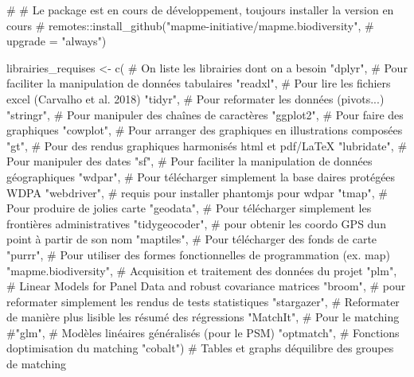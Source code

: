\documentclass[
  letterpaper,
  DIV=11,
  numbers=noendperiod]{scrreprt}
\newenvironment{Shaded}{\begin{snugshade}}{\end{snugshade}}
\newcommand{\CommentTok}[1]{\textcolor[rgb]{0.37,0.37,0.37}{#1}}
\newcommand{\FunctionTok}[1]{\textcolor[rgb]{0.28,0.35,0.67}{#1}}
\newcommand{\NormalTok}[1]{\textcolor[rgb]{0.00,0.23,0.31}{#1}}
\newcommand{\OtherTok}[1]{\textcolor[rgb]{0.00,0.23,0.31}{#1}}
\newcommand{\StringTok}[1]{\textcolor[rgb]{0.13,0.47,0.30}{#1}}
\begin{document}
\begin{Shaded}
\begin{Highlighting}[]
\CommentTok{\# \# Le package est en cours de développement, toujours installer la version en cours}
\CommentTok{\# remotes::install\_github("mapme{-}initiative/mapme.biodiversity", }
\CommentTok{\#                         upgrade = "always")}

\NormalTok{librairies\_requises }\OtherTok{\textless{}{-}} \FunctionTok{c}\NormalTok{( }\CommentTok{\# On liste les librairies dont on a besoin}
  \StringTok{"dplyr"}\NormalTok{, }\CommentTok{\# Pour faciliter la manipulation de données tabulaires}
  \StringTok{"readxl"}\NormalTok{, }\CommentTok{\# Pour lire les fichiers excel (Carvalho et al. 2018)}
  \StringTok{"tidyr"}\NormalTok{, }\CommentTok{\# Pour reformater les données (pivots...)}
  \StringTok{"stringr"}\NormalTok{, }\CommentTok{\# Pour manipuler des chaînes de caractères}
  \StringTok{"ggplot2"}\NormalTok{, }\CommentTok{\# Pour faire des graphiques}
  \StringTok{"cowplot"}\NormalTok{, }\CommentTok{\# Pour arranger des graphiques en illustrations composées}
  \StringTok{"gt"}\NormalTok{, }\CommentTok{\# Pour des rendus graphiques harmonisés html et pdf/LaTeX}
  \StringTok{"lubridate"}\NormalTok{, }\CommentTok{\# Pour manipuler des dates}
  \StringTok{"sf"}\NormalTok{, }\CommentTok{\# Pour faciliter la manipulation de données géographiques}
  \StringTok{"wdpar"}\NormalTok{, }\CommentTok{\# Pour télécharger simplement la base d\textquotesingle{}aires protégées WDPA}
  \StringTok{"webdriver"}\NormalTok{, }\CommentTok{\# requis pour installer phantomjs pour wdpar}
  \StringTok{"tmap"}\NormalTok{, }\CommentTok{\# Pour produire de jolies carte}
  \StringTok{"geodata"}\NormalTok{, }\CommentTok{\# Pour télécharger simplement les frontières administratives}
  \StringTok{"tidygeocoder"}\NormalTok{, }\CommentTok{\# pour obtenir les coordo GPS d\textquotesingle{}un point à partir de son nom}
  \StringTok{"maptiles"}\NormalTok{, }\CommentTok{\# Pour télécharger des fonds de carte }
  \StringTok{"purrr"}\NormalTok{, }\CommentTok{\# Pour utiliser des formes fonctionnelles de programmation (ex. map)}
  \StringTok{"mapme.biodiversity"}\NormalTok{, }\CommentTok{\# Acquisition et traitement des données du projet}
  \StringTok{"plm"}\NormalTok{, }\CommentTok{\# Linear Models for Panel Data and robust covariance matrices}
  \StringTok{"broom"}\NormalTok{, }\CommentTok{\# pour reformater simplement les rendus de tests statistiques}
  \StringTok{"stargazer"}\NormalTok{, }\CommentTok{\# Reformater de manière plus lisible les résumé des régressions}
  \StringTok{"MatchIt"}\NormalTok{, }\CommentTok{\# Pour le matching}
  \CommentTok{\#"glm", \# Modèles linéaires généralisés (pour le PSM)}
  \StringTok{"optmatch"}\NormalTok{, }\CommentTok{\# Fonctions d\textquotesingle{}optimisation du matching}
  \StringTok{"cobalt"}\NormalTok{) }\CommentTok{\# Tables et graphs d\textquotesingle{}équilibre des groupes de matching}
  

\end{Highlighting}
\end{Shaded}
\end{document}
